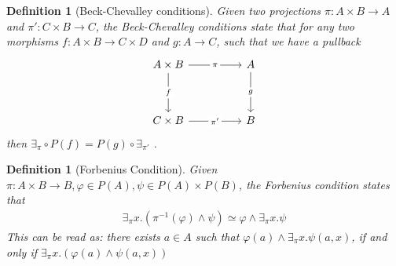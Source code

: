 \documentclass[12pt]{article}
\newtheorem{definition}[theorem]{Definition}
\begin{document}
\begin{definition}[Beck-Chevalley conditions]
    Given two projections $\pi:A\times B \to A$ and $\pi':C\times B \to C$,
    the Beck-Chevalley conditions state that for any two morphisms $f:A\times B\to C\times D$ and $g:A\to C$,
    such that we have a pullback
    \[\begin{tikzcd}
        {A\times B} && A \\
        \\
        {C\times B} && B
        \arrow["\pi"{description}, from=1-1, to=1-3]
        \arrow["g"{description}, from=1-3, to=3-3]
        \arrow["{\pi'}"{description}, from=3-1, to=3-3]
        \arrow["f"{description}, from=1-1, to=3-1]
    \end{tikzcd}\]
    then $\exists_\pi\circ P(f)=P(g)\circ\exists_{\pi'}$ 
    .
\end{definition}

\begin{definition}[Forbenius Condition]
    Given $\pi:A\times B\to B, \varphi\in P(A),\psi\in P(A)\times P(B)$, the Forbenius condition states that
    \begin{gather}
        \exists_\pi x.(\pi^{-1}(\varphi)\land\psi)\simeq \varphi\land\exists_\pi x.\psi
    \end{gather}
    This can be read as: there exists $a\in A$
    such that $ \varphi(a)\land\exists_\pi x.\psi(a,x)$,
if and only if $\exists_\pi x.(\varphi(a)\land\psi(a,x))$
\end{definition}
\end{document}
